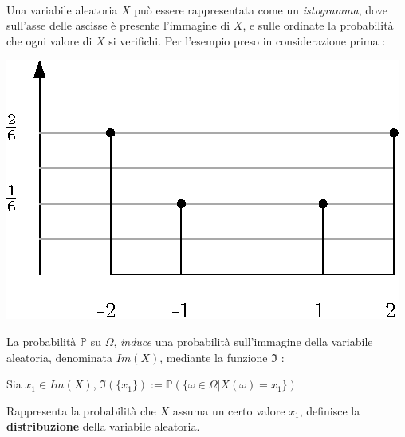\documentclass[12pt, letterpaper]{article}
\begin{document}
 \\ Una variabile aleatoria \(X\) può essere rappresentata come un \textit{istogramma}, dove sull'asse delle 
 ascisse è presente l'immagine di \(X\), e sulle ordinate la probabilità che ogni valore di \(X\) si verifichi.
 Per l'esempio preso in considerazione prima :
 \\\begin{center}
    \includegraphics[scale=1.5]{images/istogramma.eps}
\end{center}
La probabilità \(\mathbb{P}\) su \(\Omega\), \textit{induce} una probabilità sull'immagine 
della variabile aleatoria, denominata \(Im(X)\), mediante la funzione \(\Im\) :
\begin{center}
    Sia \(x_1\in Im(X)\), \(\Im(\{x_1\}):=\mathbb{P}(\{\omega\in\Omega|X(\omega)=x_1\})\)
\end{center}
Rappresenta la probabilità che \(X\) assuma un certo valore \(x_1\), definisce la \textbf{distribuzione}
della variabile aleatoria.
\end{document}
